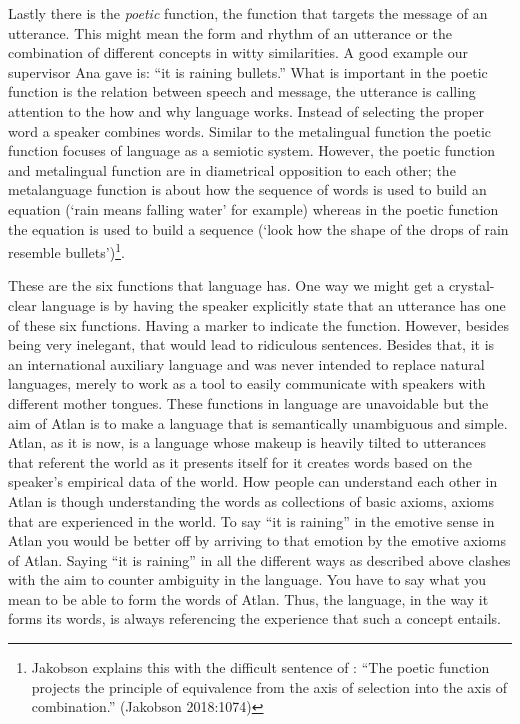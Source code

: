 Lastly there is the \textit{poetic} function, the function that targets the message of an utterance. This might mean the form and rhythm of an utterance or the combination of different concepts in witty similarities. A good example our supervisor Ana gave is: “it is raining bullets.” What is important in the poetic function is the relation between speech and message, the utterance is calling attention to the how and why language works. Instead of selecting the proper word a speaker combines words. Similar to the metalingual function the poetic function focuses of language as a semiotic system. However, the poetic function and metalingual function are in diametrical opposition to each other; the metalanguage function is about how the sequence of words is used to build an equation (‘rain means falling water’ for example) whereas in the poetic function the equation is used to build a sequence (‘look how the shape of the drops of rain resemble bullets’)\footnote{Jakobson explains this with the difficult sentence of : “The poetic function projects the principle of equivalence from the axis of selection into the axis of combination.” (Jakobson 2018:1074)}.

These are the six functions that language has. One way we might get a crystal-clear language is by having the speaker explicitly state that an utterance has one of these six functions. Having a marker to indicate the function. However, besides being very inelegant, that would lead to ridiculous sentences. Besides that, it is an international auxiliary language and was never intended to replace natural languages, merely to work as a tool to easily communicate with speakers with different mother tongues. These functions in language are unavoidable but the aim of Atlan is to make a language that is semantically unambiguous and simple. Atlan, as it is now, is a language whose makeup is heavily tilted to utterances that referent the world as it presents itself for it creates words based on the speaker's empirical data of the world. How people can understand each other in Atlan is though understanding the words as collections of basic axioms, axioms that are experienced in the world. To say “it is raining” in the emotive sense in Atlan you would be better off by arriving to that emotion by the emotive axioms of Atlan. Saying “it is raining” in all the different ways as described above clashes with the aim to counter ambiguity in the language. You have to say what you mean to be able to form the words of Atlan. Thus, the language, in the way it forms its words, is always referencing the experience that such a concept entails.   

